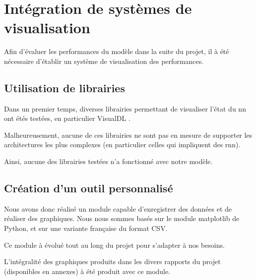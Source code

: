 \section{Intégration de systèmes de visualisation}\label{sec:gmsnn_track}
Afin d'évaluer les performances du modèle dans la suite du projet, il à été nécessaire d'établir un système de visualisation des performances.

\subsection{Utilisation de librairies}
Dans un premier temps, diverses librairies permettant de visualiser l'état du \gls{nn} ont étés testées, en particulier VisualDL \autocite{VisualDLGit,VisualDLSite}.

Malheureusement, aucune de ces librairies ne sont pas en mesure de supporter les architectures les plus complexes (en particulier celles qui impliquent des \gls{rnn}).

Ainsi, aucune des librairies testées n'a fonctionné avec notre modèle.

\subsection{Création d'un outil personnalisé}
Nous avons donc réalisé un module capable d'enregistrer des données et de réaliser des graphiques. Nous nous sommes basés sur le module \og matplotlib\fg{}\autocite{matplotlib} de Python, et sur une variante française du format CSV\autocite{csv}.

Ce module à évolué tout au long du projet pour s'adapter à nos besoins.

L'intégralité des graphiques produits dans les divers rapports du projet (disponibles en annexes) à été produit avec ce module.
